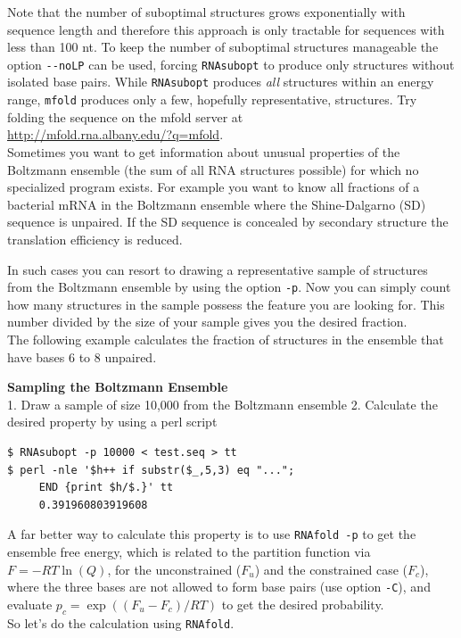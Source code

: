 \documentclass[]{article}
\begin{document}
Note that the number of suboptimal structures grows exponentially with
sequence length and therefore this approach is only tractable for
sequences with less than 100 nt. To keep the number of suboptimal
structures manageable the option \texttt{-\/-noLP} can be used, forcing
\texttt{RNAsubopt} to produce only structures without isolated base
pairs. While \texttt{RNAsubopt} produces \emph{all} structures within an
energy range, \texttt{mfold} produces only a few, hopefully
representative, structures. Try folding the sequence on the mfold server
at\\
\url{http://mfold.rna.albany.edu/?q=mfold}.\\
 Sometimes you want to get information about unusual properties of the
Boltzmann ensemble (the sum of all RNA structures possible) for which no
specialized program exists. For example you want to know all fractions
of a bacterial mRNA in the Boltzmann ensemble where the Shine-Dalgarno
(SD) sequence is unpaired. If the SD sequence is concealed by secondary
structure the translation efficiency is reduced.

In such cases you can resort to drawing a representative sample of
structures from the Boltzmann ensemble by using the option \texttt{-p}.
Now you can simply count how many structures in the sample possess the
feature you are looking for. This number divided by the size of your
sample gives you the desired fraction.\\
 The following example calculates the fraction of structures in the
ensemble that have bases 6 to 8 unpaired.

\textbf{Sampling the Boltzmann Ensemble}\\
1. Draw a sample of size 10,000 from the Boltzmann ensemble 2. Calculate
the desired property by using a perl script

\begin{verbatim}
$ RNAsubopt -p 10000 < test.seq > tt
$ perl -nle '$h++ if substr($_,5,3) eq "...";
     END {print $h/$.}' tt
     0.391960803919608
\end{verbatim}

A far better way to calculate this property is to use
\texttt{RNAfold\ -p} to get the ensemble free energy, which is related
to the partition function via \(F = - RT\ln\left( Q \right)\), for the
unconstrained (\(F_{u}\)) and the constrained case (\(F_{c}\)), where
the three bases are not allowed to form base pairs (use option
\texttt{-C}), and evaluate
\(p_{c} = \exp\left( \left( {F_{u} - F_{c}} \right)\slash RT \right)\)
to get the desired probability.\\
 So let's do the calculation using \texttt{RNAfold}.
\end{document}
